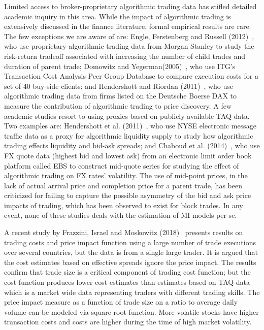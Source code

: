 Limited access to broker-proprietary algorithmic trading data has stifled detailed academic inquiry in this area. While the impact of algorithmic trading is extensively discussed in the finance literature, formal empirical results are rare. The few exceptions we are aware of are: Engle, Ferstenberg and Russell (2012)~\cite{engle2012}, who use proprietary algorithmic trading data from Morgan Stanley to study the risk-return tradeoff associated with increasing the number of child trades and duration of parent trade; Domowitz and Yegerman(2005)~\cite{doye}, who use ITG's Transaction Cost Analysis Peer Group Database to compare execution costs for a set of 40 buy-side clients; and Hendershott and Riordan (2011)~\cite{hernderrio}, who use algorithmic trading data from firms listed on the Deutsche Boerse DAX to measure the contribution of algorithmic trading to price discovery. A few academic studies resort to using proxies based on publicly-available TAQ data. Two examples are: Hendershott et al. (2011)~\cite{hender2011}, who use NYSE electronic message traffic data as a proxy for algorithmic liquidity supply to study how algorithmic trading effects liquidity and bid-ask spreads; and Chaboud et al. (2014)~\cite{chaboud}, who use FX quote data (highest bid and lowest ask) from an electronic limit order book platform called EBS to construct mid-quote series for studying the effect of algorithmic trading on FX rates' volatility. The use of mid-point prices, in the lack of actual arrival price and completion price for a parent trade, has been criticized for failing to capture the possible asymmetry of the bid and ask price impacts of trading, which has been observed to exist for block trades. In any event, none of these studies deals with the estimation of MI models per-se.


A recent study by Frazzini, Israel and Moskowitz (2018)~\cite{frazzini} presents results on trading costs and price impact function using a large number of trade executions over several countries, but the data is from a single large trader. It is argued that the cost estimates based on effective spreads ignore the price impact. The results confirm that trade size is a critical component of trading cost function; but the cost function produces lower cost estimates than estimates based on TAQ data which is a market wide data representing traders with different trading skills. The price impact measure as a function of trade size on a ratio to average daily volume can be modeled via square root function. More volatile stocks have higher transaction costs and costs are higher during the time of high market volatility. \twomedskip


